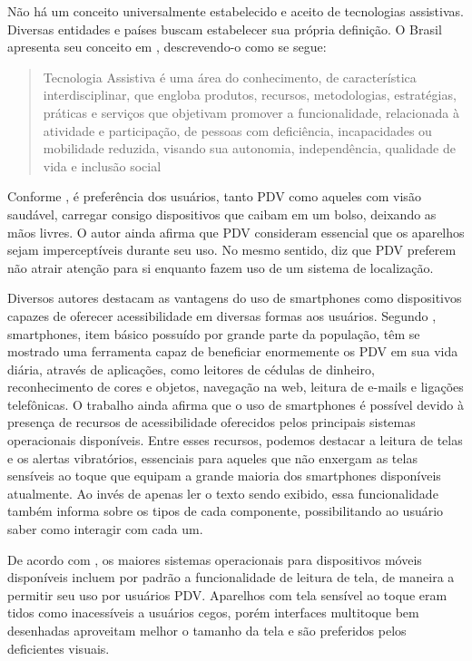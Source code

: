\documentclass[english,brazilian]{UNISINOSmonografia}
\begin{document}
Não há um conceito universalmente estabelecido e aceito de tecnologias assistivas. Diversas entidades e países buscam estabelecer sua própria definição. O Brasil apresenta seu conceito em \cite{TA2009}, descrevendo-o como se segue:
\begin{quote}
	Tecnologia Assistiva é uma área do conhecimento, de característica interdisciplinar, que
	engloba produtos, recursos, metodologias, estratégias, práticas e serviços que objetivam promover
	a funcionalidade, relacionada à atividade e participação, de pessoas com deficiência,
	incapacidades ou mobilidade reduzida, visando sua autonomia, independência, qualidade de vida e
	inclusão social
\end{quote}

Conforme , é preferência dos usuários, tanto PDV como aqueles com visão saudável, carregar consigo dispositivos que caibam em um bolso, deixando as mãos livres. O autor ainda afirma que PDV consideram essencial que os aparelhos sejam imperceptíveis durante seu uso. No mesmo sentido,  diz que PDV preferem não atrair atenção para si enquanto fazem uso de um sistema de localização.

Diversos autores destacam as vantagens do uso de smartphones como dispositivos capazes de oferecer acessibilidade em diversas formas aos usuários. Segundo , smartphones, item básico possuído por grande parte da população, têm se mostrado uma ferramenta capaz de beneficiar enormemente os PDV em sua vida diária, através de aplicações, como leitores de cédulas de dinheiro, reconhecimento de cores e objetos, navegação na web, leitura de e-mails e ligações telefônicas. O trabalho ainda afirma que o uso de smartphones é possível devido à presença de recursos de acessibilidade oferecidos pelos principais sistemas operacionais disponíveis. Entre esses recursos, podemos destacar a leitura de telas e os alertas vibratórios, essenciais para aqueles que não enxergam as telas sensíveis ao toque que equipam a grande maioria dos smartphones disponíveis atualmente. Ao invés de apenas ler o texto sendo exibido, essa funcionalidade também informa sobre os tipos de cada componente, possibilitando ao usuário saber como interagir com cada um.

De acordo com , os maiores sistemas operacionais para dispositivos móveis disponíveis incluem por padrão a funcionalidade de leitura de tela, de maneira a permitir seu uso por usuários PDV. Aparelhos com tela sensível ao toque eram tidos como inacessíveis a usuários cegos, porém interfaces multitoque bem desenhadas aproveitam melhor o tamanho da tela e são preferidos pelos deficientes visuais.
\end{document}
